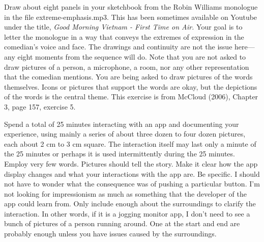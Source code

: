 \hypertarget{extreme-emphasis}{%
\label{extreme-emphasis}}

Draw about eight panels in your sketchbook from the Robin Williams
monologue in the file extreme-emphasis.mp3. This has been sometimes
available on Youtube under the title, \emph{Good Morning Vietnam - First
Time on Air.} Your goal is to letter the monologue in a way that conveys
the extremes of expression in the comedian's voice and face. The
drawings and continuity are not the issue here---any eight moments from
the sequence will do. Note that you are not asked to draw pictures of a
person, a microphone, a room, nor any other representation that the
comedian mentions. You are being asked to draw pictures of the words
themselves. Icons or pictures that support the words are okay, but the
depictions of the words is the central theme. This exercise is from
McCloud (2006), Chapter 3, page 157, exercise 5.

\hypertarget{record-interaction}{%
\label{record-interaction}}

Spend a total of 25 minutes interacting with an app and documenting your
experience, using mainly a series of about three dozen to four dozen
pictures, each about 2 cm to 3 cm square. The interaction itself may
last only a minute of the 25 minutes or perhaps it is used
intermittently during the 25 minutes. Employ very few words. Pictures
should tell the story. Make it clear how the app display changes and
what your interactions with the app are. Be specific. I should not have
to wonder what the consequence was of pushing a particular button. I'm
not looking for impressionism as much as something that the developer of
the app could learn from. Only include enough about the surroundings to
clarify the interaction. In other words, if it is a jogging monitor app,
I don't need to see a bunch of pictures of a person running around. One
at the start and end are probably enough unless you have issues caused
by the surroundings.

